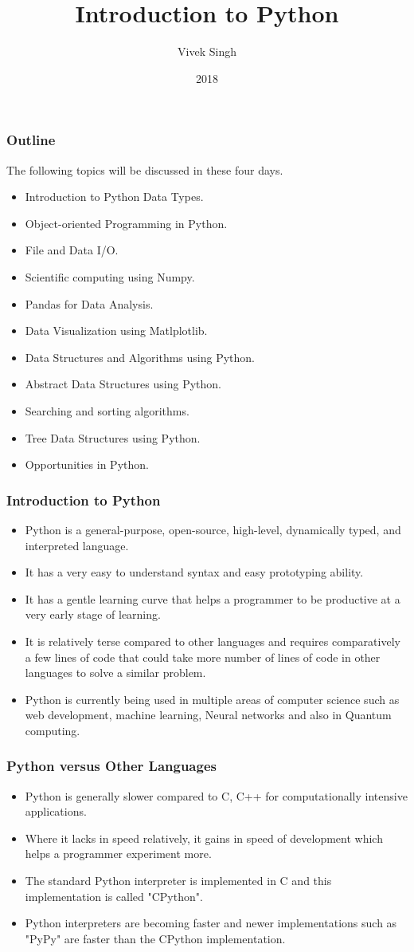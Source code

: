 \documentclass{beamer}
\title{Introduction to Python}
\author{Vivek Singh}
\institute{Information Systems Decision Sciences (ISDS)\\
MUMA College of Business\\
University of South Florida \\
Tampa, Florida}
\date{2018}
\begin{document}
 
\frame{\titlepage}

\begin{frame}
\frametitle{Outline}
The following topics will be discussed in these four days.
\begin{itemize}[<+->]
\item Introduction to Python Data Types.
\item Object-oriented Programming in Python.
\item File and Data I/O.
\item Scientific computing using Numpy. 
\item Pandas for Data Analysis.
\item Data Visualization using Matlplotlib.
\item Data Structures and Algorithms using Python.
\item Abstract Data Structures using Python.
\item Searching and sorting algorithms.
\item Tree Data Structures using Python.
\item Opportunities in Python. 
\end{itemize}
\end{frame}


\begin{frame}
\frametitle{Introduction to Python}
\begin{itemize}[<+->]
\item Python is a general-purpose, open-source, high-level, dynamically typed, and interpreted language.
\item It has a very easy to understand syntax and easy prototyping ability.
\item It has a gentle learning curve that helps a  programmer to be productive at a very early stage of learning.
\item It is relatively terse compared to other languages and requires comparatively  a few lines of code that could take more number of lines of code in other languages to solve a similar problem.
\item Python is currently being used in multiple areas of computer science such as web development, machine learning, Neural networks and also in Quantum computing.
\end{itemize}
\end{frame}

\begin{frame}
\frametitle{Python versus Other Languages}
\begin{itemize}[<+->]
\item Python is generally slower compared to C, C++ for computationally intensive applications.
\item Where it lacks in speed relatively, it gains in speed of development which helps a programmer experiment more.
\item The standard Python interpreter is implemented in C and this implementation is called "CPython".
\item Python interpreters are becoming faster and newer implementations such as "PyPy" are faster than the CPython implementation.
\end{itemize}
\end{frame}
\end{document}
